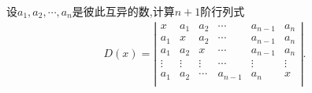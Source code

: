 \documentclass[../../main.tex]{subfiles}%
\begin{document}
\begin{example}
设$a_1,a_2,\cdots,a_n$是彼此互异的数,计算$n+1$阶行列式
\begin{align*}
D\left( x \right) =\left| \begin{matrix}
x&		a_1&		a_2&		\cdots&		a_{n-1}&		a_n\\
a_1&		x&		a_2&		\cdots&		a_{n-1}&		a_n\\
a_1&		a_2&		x&		\cdots&		a_{n-1}&		a_n\\
\vdots&		\vdots&		\vdots&		\cdots&		\vdots&		\vdots\\
a_1&		a_2&		\cdots&		a_{n-1}&		a_n&		x\\
\end{matrix} \right|.
\end{align*}
\end{example}
\begin{solution}


\end{solution}
\end{document}
